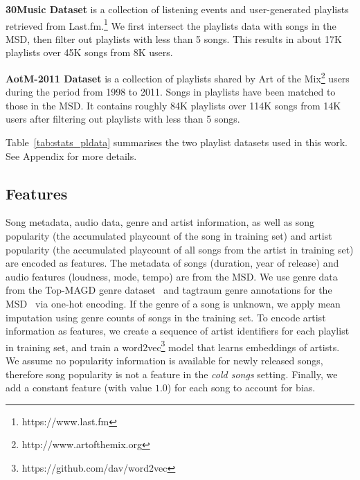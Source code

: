 %

\noindent
{\bf 30Music Dataset} is a collection of listening events and user-generated
playlists retrieved from Last.fm.\footnote{https://www.last.fm}
We first intersect the playlists data with songs in the MSD, 
then filter out playlists with less than 5 songs.
This results in about 17K playlists over 45K songs from 8K users.

\noindent
{\bf AotM-2011 Dataset} is a collection of playlists shared by Art of the Mix\footnote{http://www.artofthemix.org} 
users during the period from 1998 to 2011. Songs in playlists have been matched to those in the MSD.
It contains 
roughly 84K playlists over 114K songs from 14K users
after filtering out playlists with less than 5 songs.

Table~\ref{tab:stats_pldata} summarises the two 
playlist datasets used in this work.
See Appendix for more details.


\subsection{Features}

Song metadata, audio data, genre and artist information, as well as song popularity
(\ie the accumulated playcount of the song in training set)
and artist popularity 
(\ie the accumulated playcount of all songs from the artist in training set)
are encoded as features.
%
The metadata of songs (\eg duration, year of release) and audio features (\eg loudness, mode, tempo) are from the MSD.
We use genre data from the Top-MAGD genre dataset~\cite{schindler2012facilitating}
and tagtraum genre annotations for the MSD~\cite{schreiber2015improving} via one-hot encoding.
If the genre of a song is unknown, 
we apply mean imputation using genre counts of songs in the training set.
To encode artist information as features,
we create a sequence of artist identifiers for each playlist in training set, and train
a word2vec\footnote{https://github.com/dav/word2vec} model that learns embeddings of artists.
%
We assume no popularity information is available for newly released songs,
therefore song popularity is not a feature in the \emph{cold songs} setting.
Finally, we add a constant feature (with value $1.0$) for each song to account for bias.


